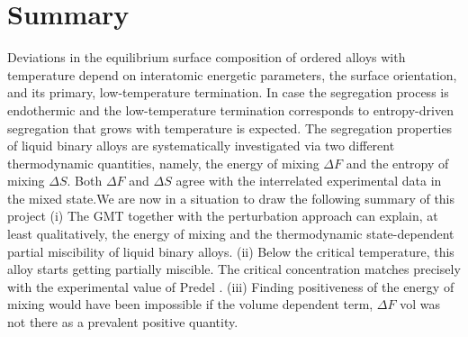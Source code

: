 \documentclass[12pt]{article}
\newcommand*{\1}{\hspace{1pt}}
\begin{document}
    \section{Summary}

    Deviations in the equilibrium surface composition of ordered alloys with temperature depend on 
    interatomic energetic parameters, the surface orientation, and its primary, low-temperature 
    termination. In case the segregation process is endothermic and the low-temperature termination 
    corresponds to entropy-driven segregation that
    grows with temperature is expected. The segregation properties of liquid binary alloys are 
    systematically investigated via two different thermodynamic quantities, namely, the energy of mixing 
    $\Delta F$ and
    the entropy of mixing $\Delta S$. Both $\Delta F$ and $\Delta S$ agree with the interrelated 
    experimental data in the mixed state.We are now in a situation to draw the following summary of 
    this project (i) The GMT together with the perturbation approach can explain, at least qualitatively, 
    the energy of mixing and the thermodynamic state-dependent partial miscibility of liquid binary alloys.
    (ii) Below the critical temperature, this alloy starts getting partially miscible. 
    The critical concentration matches precisely with the experimental value of Predel .
    (iii) Finding positiveness of the energy of
    mixing would have been impossible if the volume dependent
    term, $\Delta F$ vol was not there as a prevalent positive quantity.

    
    
    
\end{document}
